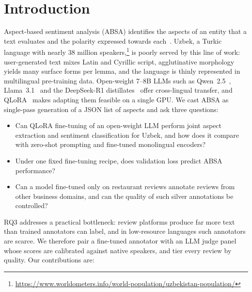 \documentclass[runningheads]{llncs}
\begin{document}
\section{Introduction}
\label{sec:intro}
Aspect-based sentiment analysis (ABSA) identifies the aspects of an entity that a text evaluates and the polarity expressed towards each~\cite{pontiki-etal-2014-semeval}. Uzbek, a Turkic language with nearly 38 million speakers,\footnote{\url{https://www.worldometers.info/world-population/uzbekistan-population/}} is poorly served by this line of work: user-generated text mixes Latin and Cyrillic script, agglutinative morphology yields many surface forms per lemma, and the language is thinly represented in multilingual pre-training data. Open-weight 7--8B LLMs such as Qwen~2.5~\cite{Qwen2024-kr}, Llama~3.1~\cite{Grattafiori2024-ka} and the DeepSeek-R1 distillates~\cite{Guo2025} offer cross-lingual transfer, and QLoRA~\cite{3666122.3666563} makes adapting them feasible on a single GPU. We cast ABSA as single-pass generation of a JSON list of aspects and ask three questions:

\begin{itemize}
\item[\textbf{RQ1}] Can QLoRA fine-tuning of an open-weight LLM perform joint aspect extraction and sentiment classification for Uzbek, and how does it compare with zero-shot prompting and fine-tuned monolingual encoders?
\item[\textbf{RQ2}] Under one fixed fine-tuning recipe, does validation loss predict ABSA performance?
\item[\textbf{RQ3}] Can a model fine-tuned only on restaurant reviews annotate reviews from other business domains, and can the quality of such silver annotations be controlled?
\end{itemize}

\noindent RQ3 addresses a practical bottleneck: review platforms produce far more text than trained annotators can label, and in low-resource languages such annotators are scarce. We therefore pair a fine-tuned annotator with an LLM judge panel whose scores are calibrated against native speakers, and tier every review by quality. Our contributions are:
\end{document}

